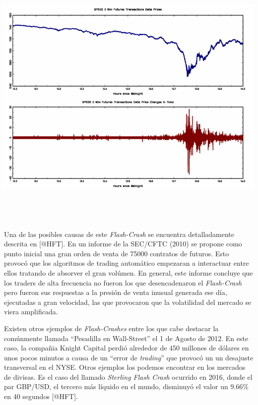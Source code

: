 \documentclass[]{article}
\begin{document}
\includegraphics[width=6.77083in,height=5.20833in]{flashcrash.png}
\centering
{}

\justifying
\setlength\parskip{5ex}

Una de las posibles causas de este \emph{Flash-Crash} se encuentra
detalladamente descrita en {[}@HFT{]}. En un informe de la SEC/CFTC
(2010) se propone como punto inicial una gran orden de venta de 75000
contratos de futuros. Esto provocó que los algoritmos de trading
automático empezaran a interactuar entre ellos tratando de absorver el
gran volúmen. En general, este informe concluye que los traders de alta
frecuencia no fueron los que desencadenaron el \emph{Flash-Crash} pero
fueron sus respuestas a la presión de venta inusual generada ese día,
ejecutadas a gran velocidad, las que provocaron que la volatilidad del
mercado se viera amplificada.

\setlength\parskip{5ex}

Existen otros ejemplos de \emph{Flash-Crashes} entre los que cabe
destacar la comúnmente llamada ``Pesadilla en Wall-Street'' el 1 de
Agosto de 2012. En este caso, la compañia Knight Capital perdió
alrededor de 450 millones de dólares en unos pocos minutos a causa de un
``error de \emph{trading}'' que provocó un un desajuste transversal en
el NYSE. Otros ejemplos los podemos encontrar en los mercados de
divisas. Es el caso del llamado \emph{Sterling Flash Crash} ocurrido en
2016, donde el par GBP/USD, el tercero más líquido en el mundo,
disminuyó el valor un 9.66\% en 40 segundos {[}@HFT{]}.
\end{document}
